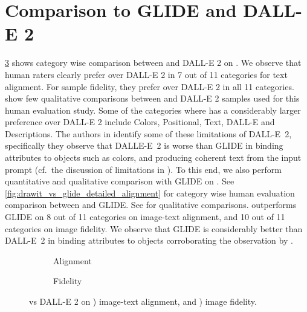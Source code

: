 \section{Comparison to GLIDE and DALL-E 2}
\label{sec:benchmark_comparison}

\cref{fig:drawit_vs_dalle2_detailed_alignment} shows category wise comparison between \name and DALL-E 2 \cite{ramesh-dalle2} on \benchmarkname. We observe that human raters clearly prefer \name over DALL-E 2 in 7 out of 11 categories for text alignment. For sample fidelity, they prefer \name over DALL-E 2 in all 11 categories.  show few qualitative comparisons between \name and DALL-E 2 samples used for this human evaluation study. Some of the categories where \name has a considerably larger preference over DALL-E 2 include Colors, Positional, Text, DALL-E and Descriptions. The authors in \cite{ramesh-dalle2} identify some of these limitations of DALL-E~2, specifically they observe that DALLE-E~2 is worse than GLIDE \cite{nichol-glide} in binding attributes to objects such as colors, and producing coherent text from the input prompt (cf.\ the discussion of limitations in \cite{ramesh-dalle2}). To this end, we also perform quantitative and qualitative comparison with GLIDE \cite{nichol-glide} on \benchmarkname. See \cref{fig:drawit_vs_glide_detailed_alignment} for category wise human evaluation comparison between \name and GLIDE. See  for qualitative comparisons. \name outperforms GLIDE on 8 out of 11 categories on image-text alignment, and 10 out of 11 categories on image fidelity. We observe that GLIDE is considerably better than DALL-E~2 in binding attributes to objects corroborating the observation by  \citep{ramesh-dalle2}.


\begin{figure}
    \centering
    \begin{subfigure}[t]{\textwidth}
    
    \caption{Alignment}
    \label{fig:drawit_vs_dalle2_detailed_alignment_alignment}
    \vspace*{0.5cm}
    \end{subfigure}
    \begin{subfigure}[t]{\textwidth}
    
    \caption{Fidelity}
    \label{fig:drawit_vs_dalle2_detailed_alignment_fidelity}
    \end{subfigure}
    \caption{\name vs DALL-E 2 on \benchmarkname {}) image-text alignment, and ) image fidelity.}
    \label{fig:drawit_vs_dalle2_detailed_alignment}
\end{figure}


